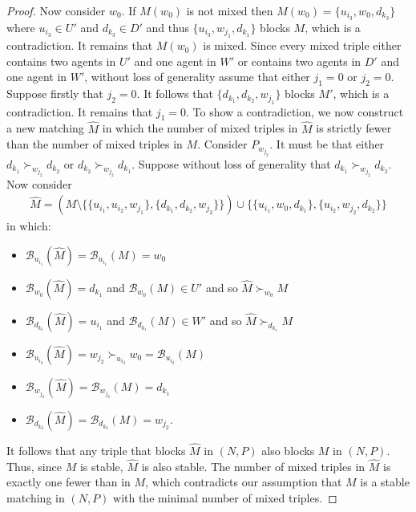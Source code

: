 \begin{proof}
Now consider $w_0$. If $M(w_0)$ is not mixed then $M(w_0) = \{ u_{i_3}, w_0, d_{k_3} \}$ where $u_{i_3} \in U'$ and $d_{k_3} \in D'$ and thus $\{ u_{i_3}, w_{j_1}, d_{k_1} \}$ blocks $M$, which is a contradiction. It remains that $M(w_0)$ is mixed. Since every mixed triple either contains two agents in $U'$ and one agent in $W'$ or contains two agents in $D'$ and one agent in $W'$, without loss of generality assume that either $j_1 = 0$ or $j_2 = 0$. Suppose firstly that $j_2 = 0$. It follows that $\{ d_{k_1}, d_{k_2}, w_{j_1} \}$ blocks $M'$, which is a contradiction. It remains that $j_1 = 0$. To show a contradiction, we now construct a new matching $\hat{M}$ in which the number of mixed triples in $\hat{M}$ is strictly fewer than the number of mixed triples in $M$. Consider $P_{w_{j_2}}$. It must be that either $d_{k_1} \succ_{w_{j_2}} d_{k_2}$ or $d_{k_2} \succ_{w_{j_2}} d_{k_1}$. Suppose without loss of generality that $d_{k_1} \succ_{w_{j_2}} d_{k_2}$. Now consider
\begin{align*}
    \hat{M} = (M \setminus \{ \{ u_{i_1}, u_{i_2}, w_{j_1} \}, \{ d_{k_1}, d_{k_2}, w_{j_2} \} \}) \cup \{ \{ u_{i_1}, w_0, d_{k_1}\}, \{ u_{i_2}, w_{j_2}, d_{k_2} \} \}
\end{align*}
in which:
\begin{itemize}
    \item $\mathscr{B}_{u_{i_1}}(\hat{M}) = \mathscr{B}_{u_{i_1}}(M) = w_0$
    \item $\mathscr{B}_{w_0}(\hat{M}) = d_{k_1}$ and $\mathscr{B}_{w_0}(M) \in U'$ and  so $\hat{M} \succ_{w_0} M$
    \item $\mathscr{B}_{d_{k_1}}(\hat{M}) = u_{i_1}$ and $\mathscr{B}_{d_{k_1}}(M) \in W'$ and so $\hat{M} \succ_{d_{k_1}} M$
    \item $\mathscr{B}_{u_{i_2}}(\hat{M}) = w_{j_2} \succ_{u_{i_2}} w_0 = \mathscr{B}_{u_{i_2}}(M)$
    \item $\mathscr{B}_{w_{j_2}}(\hat{M}) = \mathscr{B}_{w_{j_2}}(M) = d_{k_1}$
    \item $\mathscr{B}_{d_{k_2}}(\hat{M}) = \mathscr{B}_{d_{k_2}}(M) = w_{j_2}$.
\end{itemize}
It follows that any triple that blocks $\hat{M}$ in $(N, P)$ also blocks $M$ in $(N, P)$. Thus, since $M$ is stable, $\hat{M}$ is also stable. The number of mixed triples in $\hat{M}$ is exactly one fewer than in $M$, which contradicts our assumption that $M$ is a stable matching in $(N, P)$ with the minimal number of mixed triples.
\end{proof}

